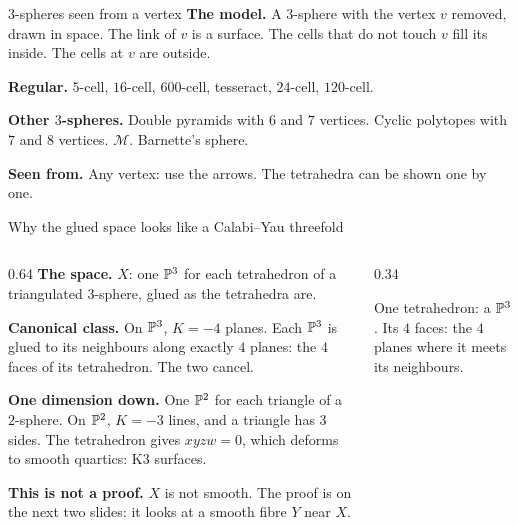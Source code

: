 \begin{frame}{\(3\)-spheres seen from a vertex}
\textbf{The model.} A \(3\)-sphere with the vertex \(v\) removed, drawn in space. The link of \(v\) is a surface. The cells that do not touch \(v\) fill its inside. The cells at \(v\) are outside.
\par\medskip
\textbf{Regular.} \(5\)-cell, \(16\)-cell, \(600\)-cell, tesseract, \(24\)-cell, \(120\)-cell.
\par\medskip
\textbf{Other \(3\)-spheres.} Double pyramids with \(6\) and \(7\) vertices. Cyclic polytopes with \(7\) and \(8\) vertices. \(\mathcal M\). Barnette's sphere.
\par\medskip
\textbf{Seen from.} Any vertex: use the arrows. The tetrahedra can be shown one by one.
\end{frame}
\begin{frame}{Why the glued space looks like a Calabi--Yau threefold}
\begin{columns}[c]
\begin{column}{0.64\textwidth}
\textbf{The space.} \(X\): one \(\mathbb P^3\) for each tetrahedron of a triangulated \(3\)-sphere, glued as the tetrahedra are.
\par\medskip
\textbf{Canonical class.} On \(\mathbb P^3\), \(K=-4\) planes. Each \(\mathbb P^3\) is glued to its neighbours along exactly \(4\) planes: the \(4\) faces of its tetrahedron. The two cancel.
\par\medskip
\textbf{One dimension down.} One \(\mathbb P^2\) for each triangle of a \(2\)-sphere. On \(\mathbb P^2\), \(K=-3\) lines, and a triangle has \(3\) sides. The tetrahedron gives \(xyzw=0\), which deforms to smooth quartics: K3 surfaces.
\par\medskip
\textbf{This is not a proof.} \(X\) is not smooth. The proof is on the next two slides: it looks at a smooth fibre \(Y\) near \(X\).
\end{column}
\begin{column}{0.34\textwidth}\centering
{}
\par\smallskip
{\small One tetrahedron: a \(\mathbb P^3\). Its \(4\) faces: the \(4\) planes where it meets its neighbours.}
\end{column}
\end{columns}
\end{frame}
\fi

